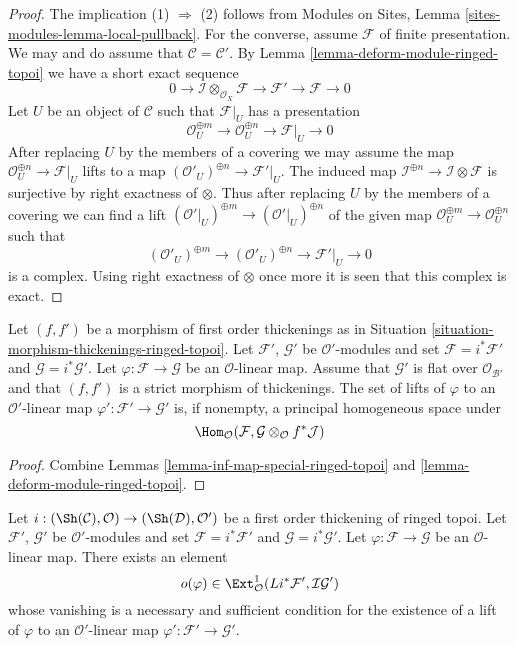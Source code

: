 \begin{proof}
The implication (1) $\Rightarrow$ (2) follows from
Modules on Sites, Lemma \ref{sites-modules-lemma-local-pullback}.
For the converse, assume $\mathcal{F}$ of finite presentation.
We may and do assume that $\mathcal{C} = \mathcal{C}'$.
By Lemma \ref{lemma-deform-module-ringed-topoi} we have a short exact sequence
$$
0 \to \mathcal{I} \otimes_{\mathcal{O}_X} \mathcal{F} \to
\mathcal{F}' \to \mathcal{F} \to 0
$$
Let $U$ be an object of $\mathcal{C}$ such that $\mathcal{F}|_U$ has a
presentation
$$
\mathcal{O}_U^{\oplus m} \to \mathcal{O}_U^{\oplus n} \to \mathcal{F}|_U \to 0
$$
After replacing $U$ by the members of a covering we may assume the
map $\mathcal{O}_U^{\oplus n} \to \mathcal{F}|_U$ lifts to a map
$(\mathcal{O}'_U)^{\oplus n} \to \mathcal{F}'|_U$. The induced map
$\mathcal{I}^{\oplus n} \to \mathcal{I} \otimes \mathcal{F}$ is
surjective by right exactness of $\otimes$. Thus after replacing $U$
by the members of a covering we can find a lift
$(\mathcal{O}'|_U)^{\oplus m} \to (\mathcal{O}'|_U)^{\oplus n}$
of the given map $\mathcal{O}_U^{\oplus m} \to \mathcal{O}_U^{\oplus n}$
such that
$$
(\mathcal{O}'_U)^{\oplus m} \to (\mathcal{O}'_U)^{\oplus n} \to
\mathcal{F}'|_U \to 0
$$
is a complex. Using right exactness of $\otimes$ once more it is seen
that this complex is exact.
\end{proof}

\begin{lemma}
\label{lemma-inf-map-rel-ringed-topoi}
Let $(f, f')$ be a morphism of first order thickenings as in
Situation \ref{situation-morphism-thickenings-ringed-topoi}.
Let $\mathcal{F}'$, $\mathcal{G}'$ be $\mathcal{O}'$-modules and set
$\mathcal{F} = i^*\mathcal{F}'$ and $\mathcal{G} = i^*\mathcal{G}'$.
Let $\varphi : \mathcal{F} \to \mathcal{G}$ be an $\mathcal{O}$-linear map.
Assume that $\mathcal{G}'$ is flat over $\mathcal{O}_{\mathcal{B}'}$ and that
$(f, f')$ is a strict morphism of thickenings.
The set of lifts of $\varphi$ to an $\mathcal{O}'$-linear map
$\varphi' : \mathcal{F}' \to \mathcal{G}'$ is, if nonempty, a principal
homogeneous space under
$$
\Hom_\mathcal{O}(\mathcal{F},
\mathcal{G} \otimes_\mathcal{O} f^*\mathcal{J})
$$
\end{lemma}

\begin{proof}
Combine Lemmas \ref{lemma-inf-map-special-ringed-topoi} and
\ref{lemma-deform-module-ringed-topoi}.
\end{proof}

\begin{lemma}
\label{lemma-inf-obs-map-special-ringed-topoi}
Let $i : (\Sh(\mathcal{C}), \mathcal{O}) \to (\Sh(\mathcal{D}), \mathcal{O}')$
be a first order thickening of ringed topoi.
Let $\mathcal{F}'$, $\mathcal{G}'$ be $\mathcal{O}'$-modules and set
$\mathcal{F} = i^*\mathcal{F}'$ and $\mathcal{G} = i^*\mathcal{G}'$.
Let $\varphi : \mathcal{F} \to \mathcal{G}$ be an $\mathcal{O}$-linear map.
There exists an element
$$
o(\varphi) \in
\Ext^1_\mathcal{O}(Li^*\mathcal{F}', \mathcal{I}\mathcal{G}')
$$
whose vanishing is a necessary and sufficient condition for the
existence of a lift of $\varphi$ to an $\mathcal{O}'$-linear map
$\varphi' : \mathcal{F}' \to \mathcal{G}'$.
\end{lemma}

